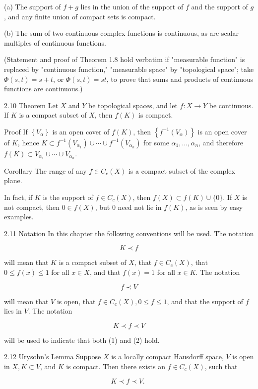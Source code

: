 \documentclass[10pt]{article}
\begin{document}
(a) The support of $f+g$ lies in the union of the support of $f$ and the support of $g$, and any finite union of compact sets is compact.

(b) The sum of two continuous complex functions is continuous, as are scalar multiples of continuous functions.

(Statement and proof of Theorem 1.8 hold verbatim if "measurable function" is replaced by "continuous function," "measurable space" by "topological space"; take $\Phi(s, t)=s+t$, or $\Phi(s, t)=s t$, to prove that sums and products of continuous functions are continuous.)

2.10 Theorem Let $X$ and $Y$ be topological spaces, and let $f: X \rightarrow Y$ be continuous. If $K$ is a compact subset of $X$, then $f(K)$ is compact.

Proof If $\left\{V_{\alpha}\right\}$ is an open cover of $f(K)$, then $\left\{f^{-1}\left(V_{\alpha}\right)\right\}$ is an open cover of $K$, hence $K \subset f^{-1}\left(V_{\alpha_{1}}\right) \cup \cdots \cup f^{-1}\left(V_{\alpha_{n}}\right)$ for some $\alpha_{1}, \ldots, \alpha_{n}$, and therefore $f(K) \subset V_{\alpha_{1}} \cup \cdots \cup V_{\alpha_{n}}$.

Corollary The range of any $f \in C_{c}(X)$ is a compact subset of the complex plane.

In fact, if $K$ is the support of $f \in C_{c}(X)$, then $f(X) \subset f(K) \cup\{0\}$. If $X$ is not compact, then $0 \in f(X)$, but 0 need not lie in $f(K)$, as is seen by easy examples.

2.11 Notation In this chapter the following conventions will be used. The notation

$$
K \prec f
$$

will mean that $K$ is a compact subset of $X$, that $f \in C_{c}(X)$, that $0 \leq f(x) \leq 1$ for all $x \in X$, and that $f(x)=1$ for all $x \in K$. The notation

$$
f \prec V
$$

will mean that $V$ is open, that $f \in C_{c}(X), 0 \leq f \leq 1$, and that the support of $f$ lies in $V$. The notation

$$
K \prec f \prec V
$$

will be used to indicate that both (1) and (2) hold.

2.12 Urysohn's Lemma Suppose $X$ is a locally compact Hausdorff space, $V$ is open in $X, K \subset V$, and $K$ is compact. Then there exists an $f \in C_{c}(X)$, such that

$$
K \prec f \prec V \text {. }
$$
\end{document}
